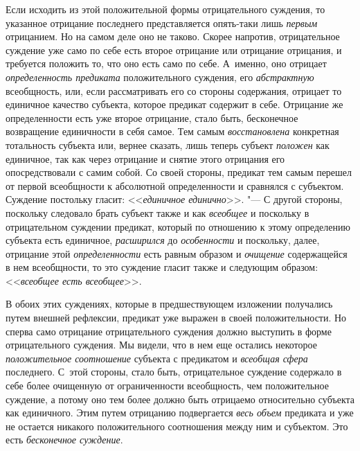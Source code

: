 Если исходить из этой положительной формы отрицательного
суждения, то указанное отрицание последнего представляется опять-таки лишь
{\em первым} отрицанием.
Но на самом деле оно не таково. Скорее напротив, отрицательное суждение уже
само по себе есть второе отрицание или отрицание отрицания, и требуется
положить то, что оно есть само по себе. А~именно, оно отрицает
{\em определенность предиката}
положительного суждения, его
{\em абстрактную}
всеобщность, или, если рассматривать его со стороны
содержания, отрицает то единичное качество субъекта, которое предикат
содержит в себе. Отрицание же определенности есть уже второе отрицание,
стало быть, бесконечное возвращение единичности в себя самое. Тем самым
{\em восстановлена}
конкретная тотальность субъекта или, вернее сказать, лишь
теперь субъект {\em положен}
как единичное, так как через отрицание и снятие этого
отрицания его опосредствовали с самим собой. Со своей стороны, предикат тем
самым перешел от первой всеобщности к абсолютной определенности и сравнялся
с субъектом. Суждение постольку гласит:
<<{\em единичное единично}>>. "---
С другой стороны, поскольку следовало брать субъект также и
как {\em всеобщее} и
поскольку в отрицательном суждении предикат, который по отношению к этому
определению субъекта есть единичное,
{\em расширился} до
{\em особенности} и
поскольку, далее, отрицание этой
{\em определенности} есть
равным образом и {\em очищение}
содержащейся в нем всеобщности, то это суждение гласит также
и следующим образом: <<{\em всеобщее есть всеобщее}>>.

В обоих этих суждениях, которые в предшествующем
изложении
получались путем внешней рефлексии, предикат уже выражен в
своей положительности. Но сперва само отрицание отрицательного суждения
должно выступить в форме отрицательного суждения. Мы видели, что в нем еще
остались некоторое {\em положительное
соотношение} субъекта с предикатом и
{\em всеобщая сфера}
последнего. С~этой стороны, стало быть,
отрицательное суждение содержало в себе более очищенную от ограниченности
всеобщность, чем положительное суждение, а потому оно тем более должно быть
отрицаемо относительно субъекта как единичного. Этим путем отрицанию
подвергается {\em весь объем}
предиката и уже не остается никакого положительного
соотношения между ним и субъектом. Это есть
{\em бесконечное суждение}.

